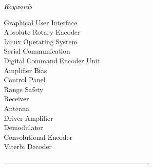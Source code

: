 \documentclass[a4paper, 12pt, oneside]{Thesis}  %
\begin{document}
\clearpage  %



\begin{center}
\LARGE\textit{Keywords}
\end{center}
\vspace{10 mm}
\begin{spacing}{1.5}


Graphical User Interface\\
Absolute Rotary Encoder\\
Linux Operating System\\ 
Serial Communication\\
Digital Command Encoder Unit\\  
Amplifier Bias\\
Control Panel\\
Range Safety\\
Receiver\\
Antenna\\
Driver Amplifier\\
Demodulator\\
Convolutional Encoder\\
Viterbi Decoder\\
\end{spacing}

\clearpage  %


%
%
%			
%
 ----------------------------------------------------------------
\end{document}
